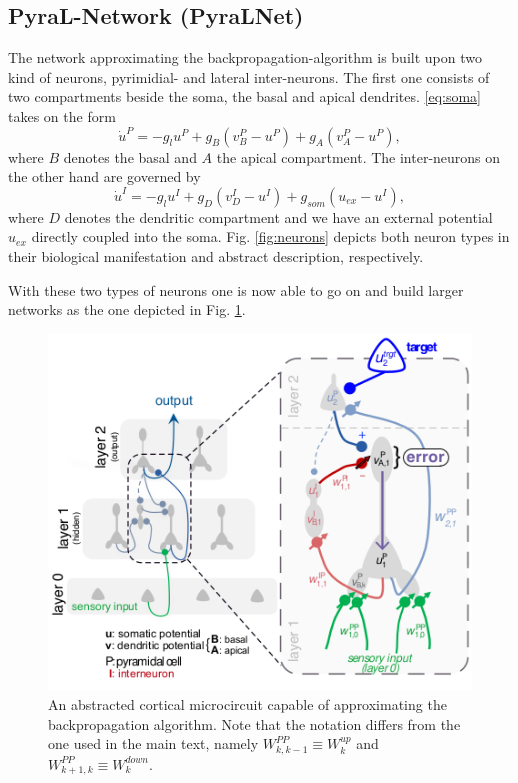 \documentclass[12pt,a4paper]{article}
\begin{document}
\subsection{PyraL-Network (PyraLNet) }
The network approximating the backpropagation-algorithm is built upon two kind of neurons, pyrimidial- and lateral inter-neurons. The first one consists of two compartments beside the soma, the basal and apical dendrites. \eqref{eq:soma} takes on the form
\begin{equation}
\dot{u}^P = -g_lu^P + g_B(v^P_B - u^P) + g_A(v^P_A - u^P), 
\end{equation}
where $B$ denotes the basal and $A$ the apical compartment.
The inter-neurons on the other hand are governed by
\begin{equation}
\dot{u}^I = -g_lu^I + g_D(v^I_D - u^I) + g_{som}(u_{ex} - u^I),
\end{equation}
where $D$ denotes the dendritic compartment and we have an external potential $u_{ex}$ directly coupled into the soma. Fig. \ref{fig:neurons} depicts both neuron types in their biological manifestation and abstract description, respectively.

With these two types of neurons one is now able to go on and build larger networks as the one depicted in Fig. \ref{fig:network}.

\begin{figure}[!ht]
  \centering
  \includegraphics[height=0.55\linewidth]{img/network.png}
  \caption{An abstracted cortical microcircuit capable of approximating the backpropagation algorithm. Note that the notation differs from the one used in the main text, namely $W^{PP}_{k,k-1}\equiv W^{up}_k$ and $W^{PP}_{k+1,k}\equiv W^{down}_k$.}
 \label{fig:network}
\end{figure}
\end{document}
